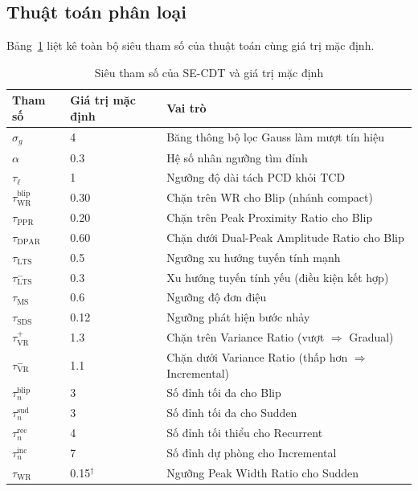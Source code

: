\subsection{Thuật toán phân loại}

Bảng~\ref{tab:se-cdt-params} liệt kê toàn bộ siêu tham số của thuật toán cùng giá trị mặc định.

\begin{table}[H]
	\centering
	\caption{Siêu tham số của SE-CDT và giá trị mặc định}
	\label{tab:se-cdt-params}
	\begin{tabular}{lll}
		\hline
		\textbf{Tham số} & \textbf{Giá trị mặc định} & \textbf{Vai trò} \\
		\hline
		$\sigma_g$ & 4 & Băng thông bộ lọc Gauss làm mượt tín hiệu \\
		$\alpha$ & 0.3 & Hệ số nhân ngưỡng tìm đỉnh \\
		$\tau_{\ell}$ & 1 & Ngưỡng độ dài tách PCD khỏi TCD \\
		$\tau_{\mathrm{WR}}^{\mathrm{blip}}$ & 0.30 & Chặn trên WR cho Blip (nhánh compact) \\
		$\tau_{\mathrm{PPR}}$ & 0.20 & Chặn trên Peak Proximity Ratio cho Blip \\
		$\tau_{\mathrm{DPAR}}$ & 0.60 & Chặn dưới Dual-Peak Amplitude Ratio cho Blip \\
		$\tau_{\mathrm{LTS}}$ & 0.5 & Ngưỡng xu hướng tuyến tính mạnh \\
		$\tau_{\mathrm{LTS}}^{-}$ & 0.3 & Xu hướng tuyến tính yếu (điều kiện kết hợp) \\
		$\tau_{\mathrm{MS}}$ & 0.6 & Ngưỡng độ đơn điệu \\
		$\tau_{\mathrm{SDS}}$ & 0.12 & Ngưỡng phát hiện bước nhảy \\
		$\tau_{\mathrm{VR}}^{+}$ & 1.3 & Chặn trên Variance Ratio (vượt $\Rightarrow$ Gradual) \\
		$\tau_{\mathrm{VR}}^{-}$ & 1.1 & Chặn dưới Variance Ratio (thấp hơn $\Rightarrow$ Incremental) \\
		$\tau_{n}^{\mathrm{blip}}$ & 3 & Số đỉnh tối đa cho Blip \\
		$\tau_{n}^{\mathrm{sud}}$ & 3 & Số đỉnh tối đa cho Sudden \\
		$\tau_{n}^{\mathrm{rec}}$ & 4 & Số đỉnh tối thiểu cho Recurrent \\
		$\tau_{n}^{\mathrm{inc}}$ & 7 & Số đỉnh dự phòng cho Incremental \\
		$\tau_{\mathrm{WR}}$ & 0.15$^{\dagger}$ & Ngưỡng Peak Width Ratio cho Sudden \\

\end{tabular}
\end{table}
